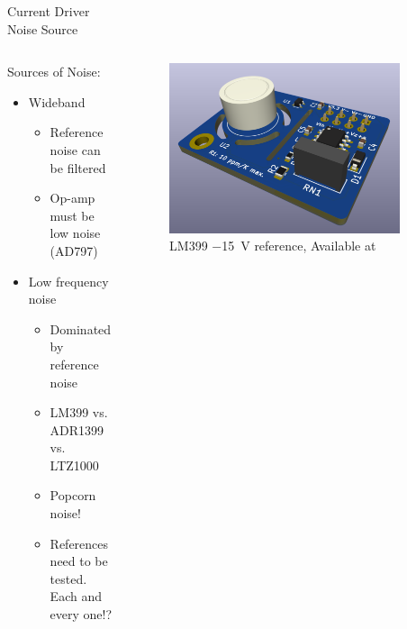 \documentclass[color={accentcolor=1b}, authorontitle=true]{tudabeamer}
\begin{document}
\begin{frame}{Current Driver\\\textnormal{\small{Noise Source}}}
    \begin{columns}[T] %
        \begin{column}{.48\textwidth}
            Sources of Noise:
            \begin{itemize}
                \item Wideband
                \begin{itemize}
                    \item Reference noise can be filtered
                    \item Op-amp must be low noise (AD797)
                \end{itemize}
                \item Low frequency noise
                \begin{itemize}
                    \item Dominated by reference noise
                    \item LM399 vs. ADR1399 vs. LTZ1000
                    \item Popcorn noise!
                    \item References need to be tested. Each and every one!?
                \end{itemize}
            \end{itemize}
        \end{column}
        \hfill
        \begin{column}{.48\textwidth}
            \begin{figure}[h]
                \includegraphics[width=0.9\textwidth]{images/reference_board.png}
                \caption{LM399 \qty{-15}{\volt} reference, Available at \cite{lm399_reference}}
            \end{figure}
        \end{column}
    \end{columns}
\end{frame}
\end{document}
